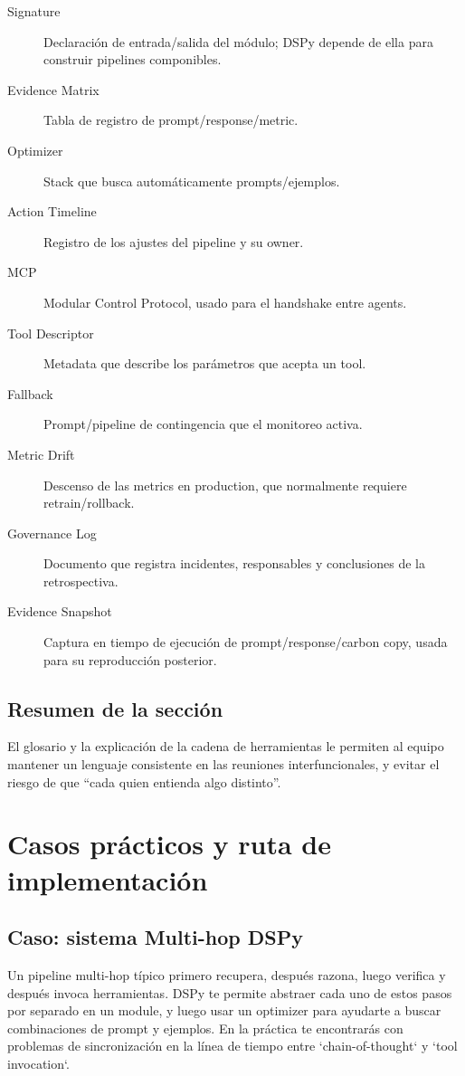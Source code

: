 \documentclass[a4paper]{article}
\begin{document}
\begin{description}
    \item[Signature] Declaración de entrada/salida del módulo; DSPy depende de ella para construir pipelines componibles.
    \item[Evidence Matrix] Tabla de registro de prompt/response/metric.
    \item[Optimizer] Stack que busca automáticamente prompts/ejemplos.
    \item[Action Timeline] Registro de los ajustes del pipeline y su owner.
    \item[MCP] Modular Control Protocol, usado para el handshake entre agents.
    \item[Tool Descriptor] Metadata que describe los parámetros que acepta un tool.
    \item[Fallback] Prompt/pipeline de contingencia que el monitoreo activa.
    \item[Metric Drift] Descenso de las metrics en production, que normalmente requiere retrain/rollback.
    \item[Governance Log] Documento que registra incidentes, responsables y conclusiones de la retrospectiva.
    \item[Evidence Snapshot] Captura en tiempo de ejecución de prompt/response/carbon copy, usada para su reproducción posterior.
\end{description}

\subsection{Resumen de la sección}

El glosario y la explicación de la cadena de herramientas le permiten al equipo mantener un lenguaje consistente en las reuniones interfuncionales, y evitar el riesgo de que ``cada quien entienda algo distinto''.
\section{Casos prácticos y ruta de implementación}

\subsection{Caso: sistema Multi-hop DSPy}

Un pipeline multi-hop típico primero recupera, después razona, luego verifica y después invoca herramientas. DSPy te permite abstraer cada uno de estos pasos por separado en un module, y luego usar un optimizer para ayudarte a buscar combinaciones de prompt y ejemplos. En la práctica te encontrarás con problemas de sincronización en la línea de tiempo entre `chain-of-thought` y `tool invocation`.
\end{document}
